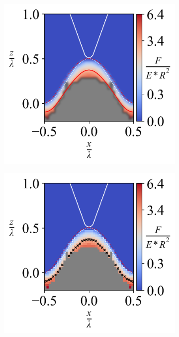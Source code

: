 \begin{figure}[H]
\centering

    \begin{subfigure}{0.32\textwidth}
        \centering
        \caption{\label{fig: All-Wave-ContourPlot-1}}
        \includegraphics[width=1\linewidth]{Figures/Wave-ContourPlot-1.png}
    \end{subfigure}
    \hfill     
    \begin{subfigure}{0.32\textwidth}
        \centering
        \caption{\label{fig: All-Wave-ContourPlotNI-1}}
        \includegraphics[width=1\linewidth]{Figures/Wave-ContourPlotNI-1.png}

\end{subfigure}
\end{figure}
